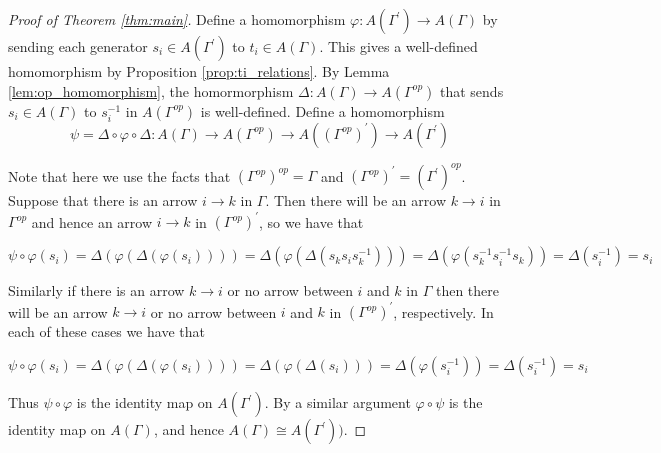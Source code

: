 \documentclass[11pt]{amsart}
\theoremstyle{definition}
\begin{document}
\begin{proof}[Proof of Theorem \ref{thm:main}]
Define a homomorphism $\varphi\colon A(\Gamma^{\prime}) \rightarrow A(\Gamma)$ by sending each generator $s_i\in A(\Gamma^{\prime})$ to $t_i\in A(\Gamma)$.  This gives a well-defined homomorphism by Proposition \ref{prop:ti_relations}.  By Lemma \ref{lem:op_homomorphism}, the homormorphism $\Delta\colon A(\Gamma) \rightarrow A(\Gamma^{op})$ that sends $s_i\in A(\Gamma)$ to $s_i^{-1}$ in $A(\Gamma^{op})$ is well-defined.  Define a homomorphism 
$$\psi = \Delta\circ\varphi\circ\Delta\colon A(\Gamma)\rightarrow A(\Gamma^{op})\rightarrow A(\left(\Gamma^{op}\right)^{\prime}) \rightarrow A(\Gamma^{\prime})$$

Note that here we use the facts that $\left(\Gamma^{op}\right)^{op} = \Gamma$ and $\left(\Gamma^{op}\right)^{\prime} = \left(\Gamma^{\prime}\right)^{op}$.  Suppose that there is an arrow $i\rightarrow k$ in $\Gamma$.  Then there will be an arrow $k\rightarrow i$ in $\Gamma^{op}$ and hence an arrow $i\rightarrow k$ in $\left(\Gamma^{op}\right)^{\prime}$, so we have that

$$\psi\circ\varphi(s_i) = \Delta(\varphi(\Delta(\varphi(s_i)))) = \Delta(\varphi(\Delta(s_ks_is_k^{-1}))) = \Delta(\varphi(s_k^{-1}s_i^{-1}s_k)) = \Delta(s_i^{-1}) = s_i$$

Similarly if there is an arrow $k\rightarrow i$ or no arrow between $i$ and $k$ in $\Gamma$ then there will be an arrow $k\rightarrow i$ or no arrow between $i$ and $k$ in $\left(\Gamma^{op}\right)^{\prime}$, respectively.  In each of these cases we have that

$$\psi\circ\varphi(s_i) = \Delta(\varphi(\Delta(\varphi(s_i)))) = \Delta(\varphi(\Delta(s_i))) = \Delta(\varphi(s_i^{-1})) = \Delta(s_i^{-1}) = s_i$$

Thus $\psi\circ\varphi$ is the identity map on $A(\Gamma^{\prime})$.  By a similar argument $\varphi\circ\psi$ is the identity map on $A(\Gamma)$, and hence $A(\Gamma)\cong A(\Gamma^{\prime}))$.
\end{proof}
\end{document}
